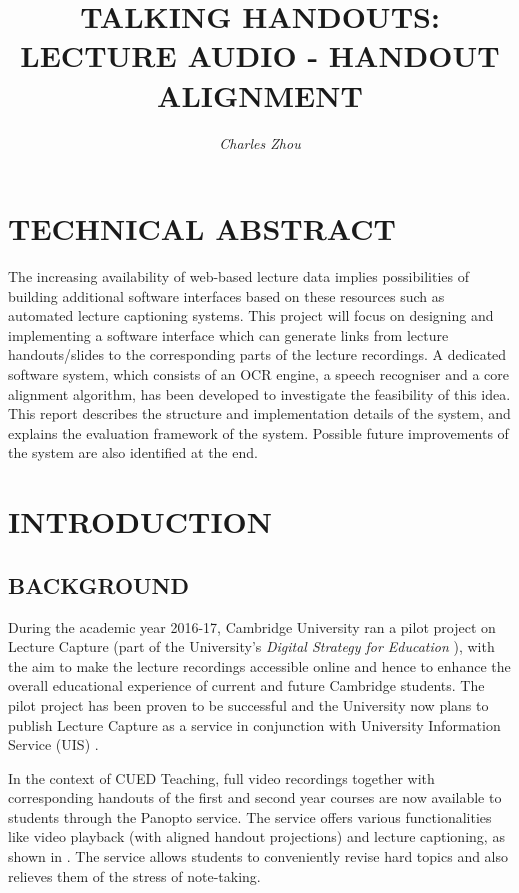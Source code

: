 \documentclass[12pt]{article}
\title{\MakeUppercase{\bfseries Talking Handouts: lecture audio - handout alignment}}
\date{}
\author{\textit{Charles Zhou}}
\begin{document}
\maketitle

\tableofcontents

\section*{TECHNICAL ABSTRACT}

{ \color{blue}
    The increasing availability of web-based lecture data implies possibilities of building additional software interfaces based on these resources such as automated lecture captioning systems. This project will focus on designing and implementing a software interface which can generate links from lecture handouts/slides to the corresponding parts of the lecture recordings. A dedicated software system, which consists of an OCR engine, a speech recogniser and a core alignment algorithm, has been developed to investigate the feasibility of this idea. This report describes the structure and implementation details of the system, and explains the evaluation framework of the system. Possible future improvements of the system are also identified at the end.
}

\newpage
\section{INTRODUCTION}

\subsection{BACKGROUND}

During the academic year 2016-17, Cambridge University ran a pilot project on Lecture Capture (part of the University's \textit{Digital Strategy for Education} \cite{digitstrategy}), with the aim to make the lecture recordings accessible online and hence to enhance the overall educational experience of current and future Cambridge students. The pilot project has been proven to be successful and the University now plans to publish Lecture Capture as a service in conjunction with University Information Service (UIS) \cite{lectcap}.

In the context of CUED Teaching, full video recordings together with corresponding handouts of the first and second year courses are now available to students through the Panopto service. The service offers various functionalities like video playback (with aligned handout projections) and lecture captioning, as shown in . The service allows students to conveniently revise hard topics and also relieves them of the stress of note-taking. 
\end{document}

